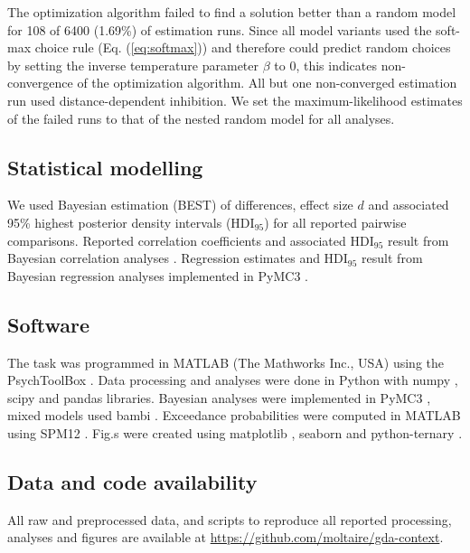 \documentclass[11pt, a4paper]{article}
\begin{document}
The optimization algorithm failed to find a solution better than a random model for 108 of 6400 (1.69\%) of estimation runs. Since all model variants used the soft-max choice rule (Eq. (\ref{eq:softmax})) and therefore could predict random choices by setting the inverse temperature parameter $\beta$ to 0, this indicates non-convergence of the optimization algorithm. All but one non-converged estimation run used distance-dependent inhibition. We set the maximum-likelihood estimates of the failed runs to that of the nested random model for all analyses.

\subsection*{Statistical modelling}
We used Bayesian estimation (BEST) \autocite{kruschke2013BayesianEstimationSupersedes,kruschke2014DoingBayesianData} of differences, effect size $d$ and associated 95\% highest posterior density intervals (HDI$_{95}$) for all reported pairwise comparisons. Reported correlation coefficients and associated HDI$_{95}$ result from Bayesian correlation analyses \autocite{lee2013BayesianCognitiveModeling}. Regression estimates and HDI$_{95}$ result from Bayesian regression analyses implemented in PyMC3 \autocite{salvatier2016ProbabilisticProgrammingPython}.

\subsection*{Software}
The task was programmed in MATLAB (The Mathworks Inc., USA) using the PsychToolBox \autocite{brainard1997psychophysics}. Data processing and analyses were done in Python with numpy \autocite{harris2020array}, scipy \autocite{jones2001SciPyOpenSource} and pandas \autocite{mckinney2012PythonDataAnalysis} libraries. Bayesian analyses were implemented in PyMC3 \autocite{salvatier2016ProbabilisticProgrammingPython}, mixed models used bambi \autocite{yarkoni2016BambiSimpleInterface}. Exceedance probabilities were computed in MATLAB using SPM12 \autocite{penny2011statistical}. Fig.s were created using matplotlib \autocite{hunter2007Matplotlib2DGraphics}, seaborn \autocite{waskom2020seaborn} and python-ternary \autocite{pythonternary}.

\subsection*{Data and code availability}
All raw and preprocessed data, and scripts to reproduce all reported processing, analyses and figures are available at \hyperlink{https://github.com/moltaire/gda-context}{https://github.com/moltaire/gda-context}.
\end{document}

